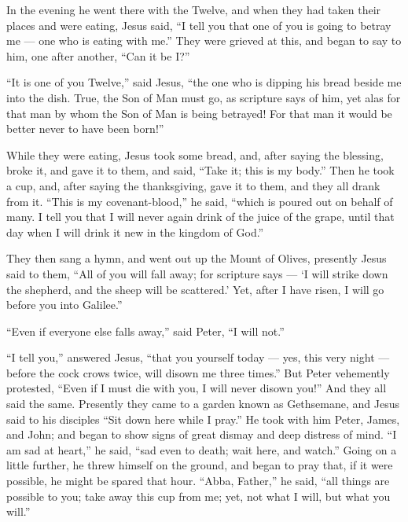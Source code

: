  In the evening he went there with the Twelve,
 and when they had taken their places and were eating,
Jesus said, ``I tell you that one of you is going to betray me --- one
who is eating with me.''  They were grieved at this, and
began to say to him, one after another, ``Can it be I?''

 ``It is one of you Twelve,'' said Jesus, ``the one who is
dipping his bread beside me into the dish.  True, the Son
of Man must go, as scripture says of him, yet alas for that man by whom
the Son of Man is being betrayed! For that man it would be better never
to have been born!''

 While they were eating, Jesus took some bread, and, after
saying the blessing, broke it, and gave it to them, and said, ``Take it;
this is my body.''  Then he took a cup, and, after saying
the thanksgiving, gave it to them, and they all drank from it.
 ``This is my covenant-blood,'' he said, ``which is poured
out on behalf of many.  I tell you that I will never again
drink of the juice of the grape, until that day when I will drink it new
in the kingdom of God.''

 They then sang a hymn, and went out up the Mount of
Olives,  presently Jesus said to them, ``All of you will
fall away; for scripture says --- `I will strike down the shepherd, and
the sheep will be scattered.'  Yet, after I have risen, I
will go before you into Galilee.''

 ``Even if everyone else falls away,'' said Peter, ``I will
not.''

 ``I tell you,'' answered Jesus, ``that you yourself today
--- yes, this very night --- before the cock crows twice, will disown me
three times.''  But Peter vehemently protested, ``Even if I
must die with you, I will never disown you!'' And they all said the
same.  Presently they came to a garden known as Gethsemane,
and Jesus said to his disciples ``Sit down here while I pray.''
 He took with him Peter, James, and John; and began to show
signs of great dismay and deep distress of mind.  ``I am
sad at heart,'' he said, ``sad even to death; wait here, and watch.''
 Going on a little further, he threw himself on the ground,
and began to pray that, if it were possible, he might be spared that
hour.  ``Abba, Father,'' he said, ``all things are possible
to you; take away this cup from me; yet, not what I will, but what you
will.''

